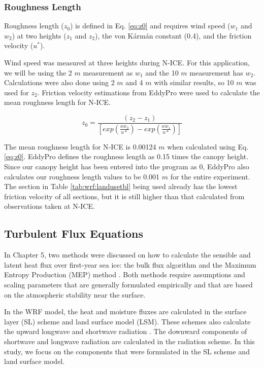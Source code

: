 \subsubsection{Roughness Length}
Roughness length ($z_{0}$) is defined in Eq. \ref{eq:z0} and requires wind speed ($w_{1}$ and $w_{2}$) at two heights ($z_{1}$ and $z_{2}$), the von K\'{a}rm\'{a}n constant (0.4), and the friction velocity ($u^{*}$). 

Wind speed was measured at three heights during N-ICE. For this application, we will be using the 2 $m$ measurement as $w_{1}$ and the 10 $m$ measurement has $w_{2}$. Calculations were also done using 2 $m$ and 4 $m$ with similar results, so 10 $m$ was used for $z_{2}$. Friction velocity estimations from EddyPro were used to calculate the mean roughness length for N-ICE.

\begin{equation}\label{eq:z0}
 z_{0} = \frac{(z_{2}-z_{1})}{[exp(\frac{\kappa w_{2}}{u*}) - exp(\frac{\kappa w_{1}}{u*})]} 
\end{equation}

The mean roughness length for N-ICE is 0.00124 $m$ when calculated using Eq. \ref{eq:z0}. EddyPro defines the roughness length as 0.15 times the canopy height. Since our canopy height has been entered into the program as 0, EddyPro also calculates our roughness length values to be 0.001 $m$ for the entire experiment. The section in Table \ref{tab:wrf:landusetbl} being used already has the lowest friction velocity of all sections, but it is still higher than that calculated from observations taken at N-ICE. 

\subsection{Turbulent Flux Equations}
In Chapter 5, two methods were discussed on how to calculate the sensible and latent heat flux over first-year sea ice: the bulk flux algorithm \citep{foken:2008} and the Maximum Entropy Production (MEP) method \citep{zhang:2021, wang:2014, wang:2009}. Both methods require assumptions and scaling parameters that are generally formulated empirically and that are based on the atmospheric stability near the surface. 

In the WRF model, the heat and moisture fluxes are calculated in the surface layer (SL) scheme and land surface model (LSM). These schemes also calculate the upward longwave and shortwave radiation \citep{dudhia:2014, skamarock:2019}. The downward components of shortwave and longwave radiation are calculated in the radiation scheme. In this study, we focus on the components that were formulated in the SL scheme and land surface model. 

